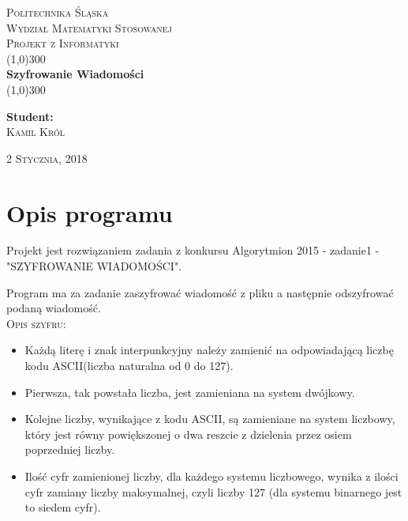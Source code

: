 \documentclass{article}
\begin{document}
\begin{titlepage}
	\begin{center}
		\textsc{\LARGE Politechnika Śląska}\\
		[1cm]
		\textsc{\large Wydział Matematyki Stosowanej}\\
		[0.5cm]
		\textsc{\normalsize Projekt z Informatyki}\\
		\line(1,0){300}\\
		[0.2cm]
		\textbf{\LARGE Szyfrowanie Wiadomości}\\	
		[0.3cm]
		\line(1,0){300}\\
		[2cm]
	\end{center}
	
	\begin{flushright}
		\textbf{Student: }\\
		\textsc{Kamil Król}
	\end{flushright}
	
	\vspace{\fill}
	\begin{center}
		\textsc{2 Stycznia, 2018}
	\end{center}
	
\end{titlepage} 

\tableofcontents
\thispagestyle{empty}
\cleardoublepage

\setcounter{page}{1}

\section{Opis programu}\label{sec:intro}
Projekt jest rozwiązaniem zadania z konkursu Algorytmion 2015 - zadanie1 - "SZYFROWANIE WIADOMOŚCI".

Program ma za zadanie zaszyfrować wiadomość z pliku a następnie odszyfrować podaną wiadomość.\\

\textsc{\large Opis szyfru:}

\begin{itemize}
\item Każdą literę i znak interpunkcyjny należy zamienić na odpowiadającą liczbę kodu ASCII(liczba naturalna od 0 do 127).
\item Pierwsza, tak powstała liczba, jest zamieniana na system dwójkowy.
\item Kolejne liczby, wynikające z kodu ASCII, są zamieniane na system liczbowy, który jest równy powiększonej o dwa reszcie z dzielenia przez osiem poprzedniej liczby.
\item Ilość cyfr zamienionej liczby, dla każdego systemu liczbowego, wynika z ilości cyfr
zamiany liczby maksymalnej, czyli liczby 127 (dla systemu binarnego jest to siedem
cyfr).
\end{itemize}
\end{document}
